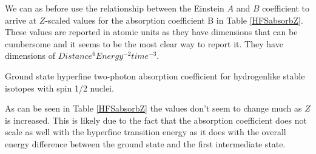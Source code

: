 We can as before use the relationship between the Einstein $A$ and $B$ coefficient to arrive at $Z$-scaled values for the absorption coefficient B in Table \ref{HFSabsorbZ}. These values are reported in atomic units as they have dimensions that can be cumbersome and it seems to be the most clear way to report it. They have dimensions of $Distance^6 Energy^{-2} time^{-3}$.
\begin{table}[h!]
  \begin{center}
    \caption{Ground state hyperfine two-photon absorption coefficient for hydrogenlike stable isotopes with spin 1/2 nuclei.}
    \label{HFSabsorbZ}
  \end{center}
\end{table}
As can be seen in Table \ref{HFSabsorbZ} the values don't seem to change much as $Z$ is increased. This is likely due to the fact that the absorption coefficient does not scale as well with the hyperfine transition energy as it does with the overall energy difference between the ground state and the first intermediate state.

